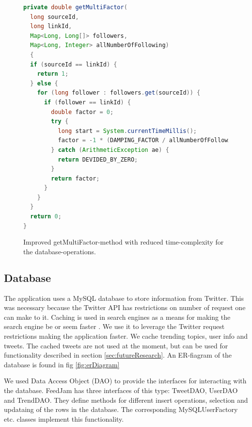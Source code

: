 \begin{figure}[h!]
\begin{lstlisting}[language=java]
private double getMultiFactor(
  long sourceId, 
  long linkId, 
  Map<Long, Long[]> followers, 
  Map<Long, Integer> allNumberOfFollowing) 
  {
  if (sourceId == linkId) {
    return 1;
  } else {
    for (long follower : followers.get(sourceId)) {
      if (follower == linkId) {
        double factor = 0;
        try {
          long start = System.currentTimeMillis();
          factor = -1 * (DAMPING_FACTOR / allNumberOfFollowing.get(linkId));
        } catch (ArithmeticException ae) {
          return DEVIDED_BY_ZERO;
        }
        return factor;
      }
    }
  }
  return 0;
}
\end{lstlisting}
\caption{Improved getMultiFactor-method with reduced time-complexity for the database-operations.}
\label{fig:getmultifactorimproved}
\end{figure}

\subsection{Database} %
\label{sec:feedJamDatabase}
The application uses a MySQL database to store information from Twitter. This was necessary because the Twitter API has restrictions on number of request one can make to it. Caching is used in search engines as a means for making the search engine be or seem faster \citep{Baeza-Yates2011}. We use it to leverage the Twitter request restrictions making the application faster. We cache trending topics, user info and tweets. The cached tweets are not used at the moment, but can be used for functionality described in  section \ref{sec:futureResearch}. An ER-fiagram of the database is found in fig \ref{fig:erDiagram}


We used Data Access Object (DAO) to provide the interfaces for interacting with the database. FeedJam has three interfaces of this type: TweetDAO, UserDAO and TrendDAO. They define methods for different insert operations, selection and updataing of the rows in the database. The corresponding MySQLUserFactory etc. classes implement this functionality.


